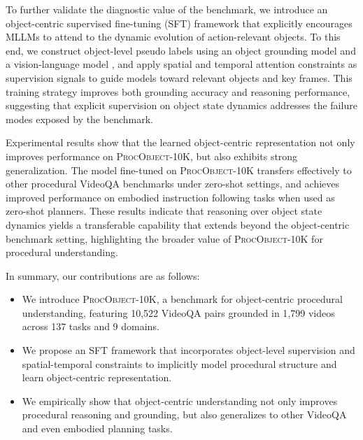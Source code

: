 To further validate the diagnostic value of the benchmark, we introduce an object-centric supervised fine-tuning (SFT) framework that explicitly encourages MLLMs to attend to the dynamic evolution of action-relevant objects. To this end, we construct object-level pseudo labels using an object grounding model \cite{liu2023grounding} and a vision-language model \cite{qwen3.5}, and apply spatial and temporal attention constraints as supervision signals to guide models toward relevant objects and key frames. This training strategy improves both grounding accuracy and reasoning performance, suggesting that explicit supervision on object state dynamics addresses the failure modes exposed by the benchmark.

Experimental results show that the learned object-centric representation not only improves performance on \textsc{ProcObject-10K}, but also exhibits strong generalization. The model fine-tuned on \textsc{ProcObject-10K} transfers effectively to other procedural VideoQA benchmarks \cite{chen2025grounded} under zero-shot settings, and achieves improved performance on embodied instruction following tasks \cite{kim2025multimodal, ALFRED20} when used as zero-shot planners. These results indicate that reasoning over object state dynamics yields a transferable capability that extends beyond the object-centric benchmark setting, highlighting the broader value of \textsc{ProcObject-10K} for procedural understanding.

In summary, our contributions are as follows:
\begin{itemize}[leftmargin=0.5cm]
\vspace{-2mm}
\item We introduce \textsc{ProcObject-10K}, a benchmark for object-centric procedural understanding, featuring 10{,}522 VideoQA pairs grounded in 1{,}799 videos across 137 tasks and 9 domains.
\item We propose an SFT framework that incorporates object-level supervision and spatial-temporal constraints to implicitly model procedural structure and learn object-centric representation.
\item We empirically show that object-centric understanding not only improves procedural reasoning and grounding, but also generalizes to other  VideoQA and even embodied planning tasks.
\vspace{-2mm}
\end{itemize}